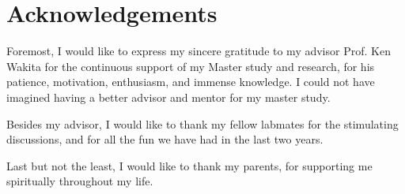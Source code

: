 \chapter*{Acknowledgements}

Foremost, I would like to express my sincere gratitude to my advisor Prof. Ken Wakita for the continuous support of my Master study and research, for his patience, motivation, enthusiasm, and immense knowledge. I could not have imagined having a better advisor and mentor for my master study.

Besides my advisor, I would like to thank my fellow labmates for the stimulating discussions, and for all the fun we have had in the last two years. 

Last but not the least, I would like to thank my parents, for supporting me spiritually throughout my life.

